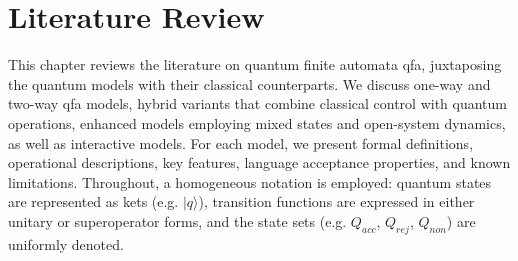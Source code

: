 \chapter{Literature Review}
\label{chap:chapter3}

This chapter reviews the literature on quantum finite automata \gls{qfa}, juxtaposing the quantum models with their classical counterparts. We discuss one-way and two-way \gls{qfa} models, hybrid variants that combine classical control with quantum operations, enhanced models employing mixed states and open-system dynamics, as well as interactive models. For each model, we present formal definitions, operational descriptions, key features, language acceptance properties, and known limitations. Throughout, a homogeneous notation is employed: quantum states are represented as kets (e.g. \( |q\rangle \)), transition functions are expressed in either unitary or superoperator forms, and the state sets (e.g. \( Q_{acc} \), \( Q_{rej} \), \( Q_{non} \)) are uniformly denoted.




